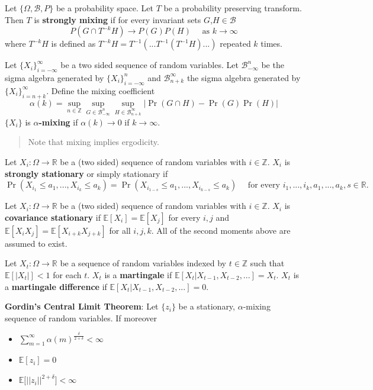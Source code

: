 \documentclass[12pt,]{book}
\providecommand{\tightlist}{%
  \setlength{\itemsep}{0pt}\setlength{\parskip}{0pt}}
\begin{document}
Let \(\{\Omega, \mathcal{B}, P \}\) be a probability space. Let \(T\) be a probability preserving transform. Then \(T\) is \textbf{strongly mixing} if for every invariant sets \(G\),\(H \in \mathcal{B}\)
\[
    P(G \cap T^{-k}H) \to P(G)P(H) \quad \text{ as } k \to \infty 
\]
where \(T^{-k}H\) is defined as \(T^{-k}H = T^{-1}(...T^{-1}(T^{-1} H)...)\) repeated \(k\) times.

Let \(\{X_i\} _ {i=-\infty}^{\infty}\) be a two sided sequence of random variables. Let \(\mathcal{B}_ {-\infty}^n\) be the sigma algebra generated by \(\{X_i\} _ {i=-\infty}^{n}\) and \(\mathcal{B}_ {n+k}^\infty\) the sigma algebra generated by \(\{X_i\} _ {i=n+k}^{\infty}\). Define the mixing coefficient
\[
    \alpha(k) = \sup_ {n \in \mathbb{Z}} \sup_ {G \in \mathcal{B}_ {-\infty}^n} \sup_ {H \in \mathcal{B}_ {n+k}^\infty} | \Pr(G \cap H) - \Pr(G) \Pr(H)| 
\]
\(\{X_i\}\) is \(\mathbb{\alpha}\)\textbf{-mixing} if \(\alpha(k) \to 0\) if \(k \to \infty\).

\begin{quote}
Note that mixing implies ergodicity.
\end{quote}

Let \(X_i : \Omega \to \mathbb{R}\) be a (two sided) sequence of random variables with \(i \in \mathbb{Z}\). \(X_i\) is \textbf{strongly stationary} or simply stationary if
\[
    \Pr (X _ {i_ 1} \leq a_ 1 , ... , X _ {i_ k} \leq a_ k ) = \Pr (X _ { i _ {1-s}} \leq a_ 1 , ... , X _ {i _ {k-s}} \leq a_ k)  \quad \text{ for every } i_ 1, ..., i_ k, a_ 1, ..., a_ k, s \in \mathbb{R}.
\]

Let \(X_i : \Omega \to \mathbb{R}\) be a (two sided) sequence of random variables with \(i \in \mathbb{Z}\). \(X_i\) is \textbf{covariance stationary} if \(\mathbb{E}[X_i] = \mathbb{E}[X_j]\) for every \(i,j\) and \(\mathbb{E}[X_i X_j] = \mathbb{E}[X _ {i+k} X _ {j+k}]\) for all \(i,j,k\). All of the second moments above are assumed to exist.

Let \(X_t : \Omega \to \mathbb{R}\) be a sequence of random variables indexed by \(t \in \mathbb{Z}\) such that \(\mathbb{E}[|X_t|] < 1\) for each \(t\). \(X_t\) is a \textbf{martingale} if \(\mathbb{E} [X _ t |X _ {t-1} , X _ {t-2} , ...] = X _ t\). \(X_t\) is a \textbf{martingale difference} if \(\mathbb{E} [X _ t | X _ {t-1} , X _ {t-2} ,...] = 0\).

\textbf{Gordin's Central Limit Theorem}:
Let \(\{ z_i \}\) be a stationary, \(\alpha\)-mixing sequence of random variables. If moreover

\begin{itemize}
\tightlist
\item
  \(\sum_ {m=1}^\infty \alpha(m)^{\frac{\delta}{2 + \delta}} < \infty\)
\item
  \(\mathbb{E}[z_i] = 0\)
\item
  \(\mathbb{E}\Big[ ||z_i || ^ {2+\delta} \Big] < \infty\)
\end{itemize}
\end{document}
